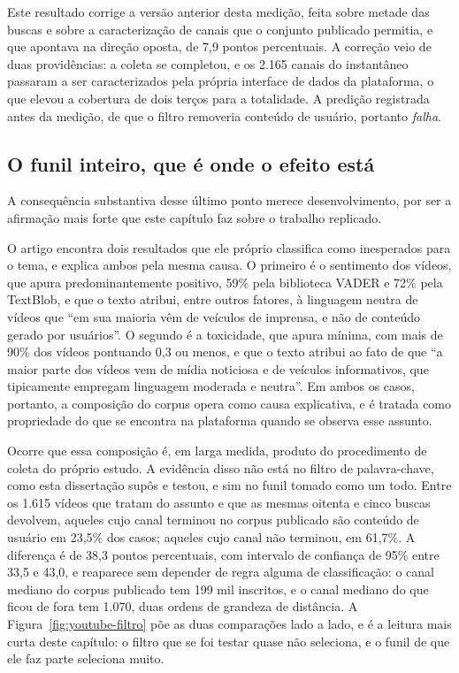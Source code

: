 Este resultado corrige a versão anterior desta medição, feita sobre metade das buscas
e sobre a caracterização de canais que o conjunto publicado permitia, e que apontava
na direção oposta, de 7,9 pontos percentuais. A correção veio de duas providências: a
coleta se completou, e os 2.165 canais do instantâneo passaram a ser caracterizados
pela própria interface de dados da plataforma, o que elevou a cobertura de dois terços
para a totalidade. A predição registrada antes da medição, de que o filtro removeria
conteúdo de usuário, portanto \emph{falha}.

\subsection{O funil inteiro, que é onde o efeito está}

A consequência substantiva desse último ponto merece desenvolvimento, por ser a
afirmação mais forte que este capítulo faz sobre o trabalho replicado.

O artigo encontra dois resultados que ele próprio classifica como inesperados para o
tema, e explica ambos pela mesma causa. O primeiro é o sentimento dos vídeos, que
apura predominantemente positivo, 59\% pela biblioteca VADER e 72\% pela TextBlob, e
que o texto atribui, entre outros fatores, à linguagem neutra de vídeos que ``em sua
maioria vêm de veículos de imprensa, e não de conteúdo gerado por usuários''. O
segundo é a toxicidade, que apura mínima, com mais de 90\% dos vídeos pontuando 0,3 ou
menos, e que o texto atribui ao fato de que ``a maior parte dos vídeos vem de mídia
noticiosa e de veículos informativos, que tipicamente empregam linguagem moderada e
neutra''. Em ambos os casos, portanto, a composição do corpus opera como causa
explicativa, e é tratada como propriedade do que se encontra na plataforma quando se
observa esse assunto.

Ocorre que essa composição é, em larga medida, produto do procedimento de coleta do
próprio estudo. A evidência disso não está no filtro de palavra-chave, como esta
dissertação supôs e testou, e sim no funil tomado como um todo. Entre os 1.615 vídeos
que tratam do assunto e que as mesmas oitenta e cinco buscas devolvem, aqueles cujo
canal terminou no corpus publicado são conteúdo de usuário em 23,5\% dos casos;
aqueles cujo canal não terminou, em 61,7\%. A diferença é de 38,3 pontos percentuais,
com intervalo de confiança de 95\% entre 33,5 e 43,0, e reaparece sem depender de
regra alguma de classificação: o canal mediano do corpus publicado tem 199 mil
inscritos, e o canal mediano do que ficou de fora tem 1.070, duas ordens de grandeza
de distância. A Figura~\ref{fig:youtube-filtro} põe as duas comparações lado a lado,
e é a leitura mais curta deste capítulo: o filtro que se foi testar quase não
seleciona, e o funil de que ele faz parte seleciona muito.

